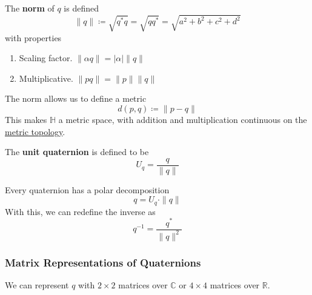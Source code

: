   \begin{definition}
    \label{def:quaternion-norm}
    The \textbf{norm} of $q$ is defined
    \begin{equation}
      \|q\| \coloneqq \sqrt{q^* q} = \sqrt{q q^*} = \sqrt{a^2 + b^2 + c^2 + d^2}
    \end{equation}
    with properties
    \begin{enumerate}
      \item Scaling factor. $\|\alpha q\| = |\alpha| \|q\|$
      \item Multiplicative. $\|p q\| = \|p\| \|q\|$
    \end{enumerate}
  \end{definition}

  The norm allows us to define a metric 
  \begin{equation}
    d(p, q) \coloneqq \|p - q\|
  \end{equation}
  This makes $\mathbb{H}$ a metric space, with addition and multiplication continuous on the \hyperref[pst-def:metric-topology]{metric topology}. 

  \begin{definition}
    \label{def:unit-quaternion}
    The \textbf{unit quaternion} is defined to be
    \begin{equation}
      U_q = \frac{q}{\|q\|}
    \end{equation}
  \end{definition}

  \begin{corollary}
    \label{thm:polar-decomposition-of-a-quaternion}
    Every quaternion has a polar decomposition
    \begin{equation}
      q = U_q \cdot \|q\|
    \end{equation}
    With this, we can redefine the inverse as
    \begin{equation}
      q^{-1} = \frac{q^*}{\|q\|^2}
    \end{equation}
  \end{corollary}

\subsubsection{Matrix Representations of Quaternions}

  We can represent $q$ with $2 \times 2$ matrices over $\mathbb{C}$ or $4\times 4 $ matrices over $\mathbb{R}$. 

